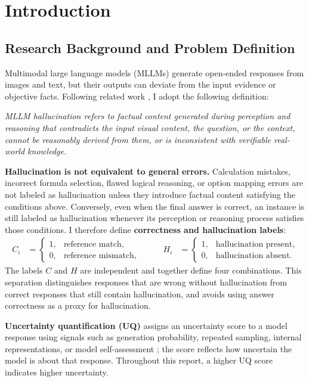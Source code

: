 \section{Introduction}
\label{sec:introduction}

\subsection{Research Background and Problem Definition}
\label{subsec:background}

Multimodal large language models (MLLMs) generate open-ended responses from images and text, but their outputs can deviate from the input evidence or objective facts. Following related work \citep{sun2023aligning}, I adopt the following definition:
\begin{gapblock}
\textit{MLLM hallucination refers to factual content generated during perception and reasoning that contradicts the input visual content, the question, or the context, cannot be reasonably derived from them, or is inconsistent with verifiable real-world knowledge.}
\end{gapblock}

\textbf{Hallucination is not equivalent to general errors.} Calculation mistakes, incorrect formula selection, flawed logical reasoning, or option mapping errors are not labeled as hallucination unless they introduce factual content satisfying the conditions above. Conversely, even when the final answer is correct, an instance is still labeled as hallucination whenever its perception or reasoning process satisfies those conditions. I therefore define \textbf{correctness and hallucination labels}:
\[
\begin{aligned}
C_i&=
\begin{cases}
1, & \text{reference match},\\
0, & \text{reference mismatch},
\end{cases}
&\qquad
H_i&=
\begin{cases}
1, & \text{hallucination present},\\
0, & \text{hallucination absent}.
\end{cases}
\end{aligned}
\]
The labels $C$ and $H$ are independent and together define four combinations. This separation distinguishes responses that are wrong without hallucination from correct responses that still contain hallucination, and avoids using answer correctness as a proxy for hallucination.

\textbf{Uncertainty quantification (UQ)} assigns an uncertainty score to a model response using signals such as generation probability, repeated sampling, internal representations, or model self-assessment \citep{liu2025uncertainty}; the score reflects how uncertain the model is about that response. Throughout this report, a higher UQ score indicates higher uncertainty.

